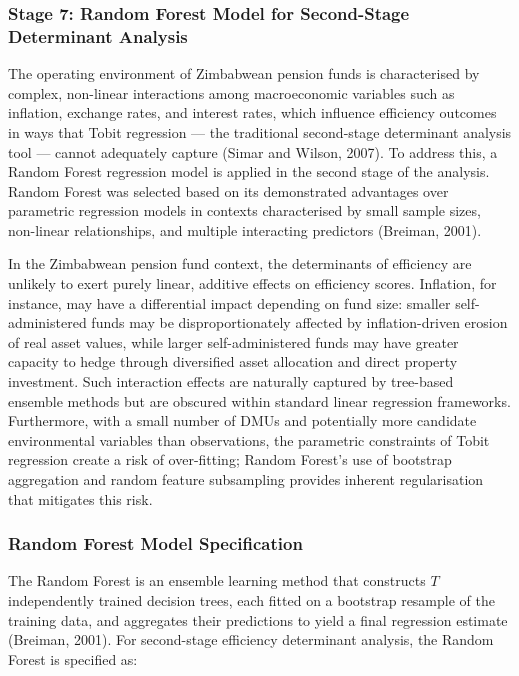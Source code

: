 \documentclass[12pt,a4paper]{article}
\begin{document}
\subsubsection{Stage 7: Random Forest Model for Second-Stage Determinant Analysis}

The operating environment of Zimbabwean pension funds is characterised by complex, non-linear interactions among macroeconomic variables such as inflation, exchange rates, and interest rates, which influence efficiency outcomes in ways that Tobit regression --- the traditional second-stage determinant analysis tool --- cannot adequately capture (Simar and Wilson, 2007). To address this, a Random Forest regression model is applied in the second stage of the analysis. Random Forest was selected based on its demonstrated advantages over parametric regression models in contexts characterised by small sample sizes, non-linear relationships, and multiple interacting predictors (Breiman, 2001).

In the Zimbabwean pension fund context, the determinants of efficiency are unlikely to exert purely linear, additive effects on efficiency scores. Inflation, for instance, may have a differential impact depending on fund size: smaller self-administered funds may be disproportionately affected by inflation-driven erosion of real asset values, while larger self-administered funds may have greater capacity to hedge through diversified asset allocation and direct property investment. Such interaction effects are naturally captured by tree-based ensemble methods but are obscured within standard linear regression frameworks. Furthermore, with a small number of DMUs and potentially more candidate environmental variables than observations, the parametric constraints of Tobit regression create a risk of over-fitting; Random Forest's use of bootstrap aggregation and random feature subsampling provides inherent regularisation that mitigates this risk.

\subsubsection{Random Forest Model Specification}

The Random Forest is an ensemble learning method that constructs $T$ independently trained decision trees, each fitted on a bootstrap resample of the training data, and aggregates their predictions to yield a final regression estimate (Breiman, 2001). For second-stage efficiency determinant analysis, the Random Forest is specified as:
\end{document}

